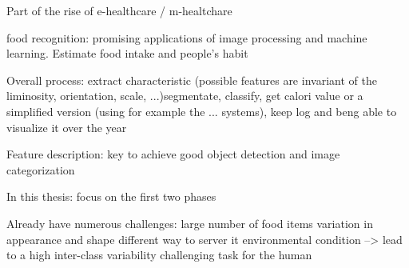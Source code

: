 Part of the rise of e-healthcare / m-healtchare \cite{Hillestad2005, Menachemi2011}

food recognition: promising applications of image processing and machine learning. Estimate food intake and people's habit

Overall process:
extract characteristic (possible features are invariant of the liminosity, orientation, scale, ...)segmentate, classify, get calori value or a simplified version (using for example the ... systems), keep log and beng able to visualize it over the year

Feature description: key to achieve good object detection and image categorization

In this thesis: focus on the first two phases

Already have numerous challenges:
large number of food items
variation in appearance and shape
different way to server it
environmental condition
--> lead to a high inter-class variability
challenging task for the human


